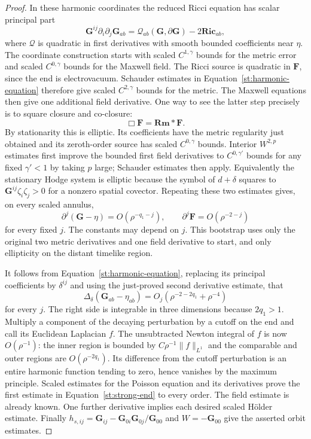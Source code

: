 \begin{proof}
In these harmonic coordinates the reduced Ricci equation has scalar
principal part
\begin{equation}\label{st:harmonic-equation}
 \mathbf G^{ij}\partial_i\partial_j\mathbf G_{ab}
   =\mathcal Q_{ab}(\mathbf G,\partial\mathbf G)
       -2\mathbf{Ric}_{ab},
\end{equation}
where $\mathcal Q$ is quadratic in first derivatives with smooth
bounded coefficients near $\eta$.  The coordinate construction
starts with scaled $C^{1,\gamma}$ bounds for the metric error and
scaled $C^{0,\gamma}$ bounds for the Maxwell field.  The Ricci source
is quadratic in $\mathbf F$, since the end is electrovacuum.
Schauder estimates in Equation~\eqref{st:harmonic-equation} therefore
give scaled $C^{2,\gamma}$ bounds for the metric.  The Maxwell
equations then give one additional field derivative.  One way to
see the latter step precisely is to square closure and co-closure:
\[
 \boldsymbol\Box\mathbf F=\mathbf{Rm}*\mathbf F.
\]
By stationarity this is elliptic.  Its coefficients have the metric
regularity just obtained and its zeroth-order source has scaled
$C^{0,\gamma}$ bounds.  Interior $W^{2,p}$ estimates first improve
the bounded first field derivatives to $C^{0,\gamma'}$ bounds for
any fixed $\gamma'<1$ by taking $p$ large; Schauder estimates then
apply.  Equivalently the stationary Hodge system is elliptic because
the symbol of $d+\delta$ squares to
$\mathbf G^{ij}\zeta_i\zeta_j>0$ for a nonzero spatial covector.
Repeating these two estimates gives, on every scaled annulus,
\[
 \partial^j(\mathbf G-\eta)=O(\rho^{-q_1-j}),\qquad
 \partial^j\mathbf F=O(\rho^{-2-j})
\]
for every fixed $j$.  The constants may depend on $j$.  This
bootstrap uses only the original two metric derivatives and one
field derivative to start, and only ellipticity on the distant
timelike region.

It follows from Equation~\eqref{st:harmonic-equation}, replacing its
principal coefficients by $\delta^{ij}$ and using the just-proved
second derivative estimate, that
\begin{equation}\label{st:integrable-laplacian}
 \Delta_\delta(\mathbf G_{ab}-\eta_{ab})
       =O_j(\rho^{-2-2q_1}+\rho^{-4})
\end{equation}
for every $j$.  The right side is integrable in three dimensions
because $2q_1>1$.  Multiply a component of the decaying perturbation
by a cutoff on the end and call its Euclidean Laplacian $f$.  The
unsubtracted Newton integral of $f$ is now $O(\rho^{-1})$: the
inner region is bounded by $C\rho^{-1}\|f\|_{L^1}$ and the
comparable and outer regions are $O(\rho^{-2q_1})$.  Its difference
from the cutoff perturbation is an entire harmonic function tending
to zero, hence vanishes by the maximum principle.  Scaled estimates
for the Poisson equation and its derivatives prove the first
estimate in Equation~\eqref{st:strong-end} to every order.  The
field estimate is already known.  One further derivative implies
each desired scaled H\"older estimate.  Finally
$h_{s,ij}=\mathbf G_{ij}-\mathbf G_{0i}\mathbf G_{0j}/\mathbf G_{00}$
and $W=-\mathbf G_{00}$ give the asserted orbit estimates.
\end{proof}

